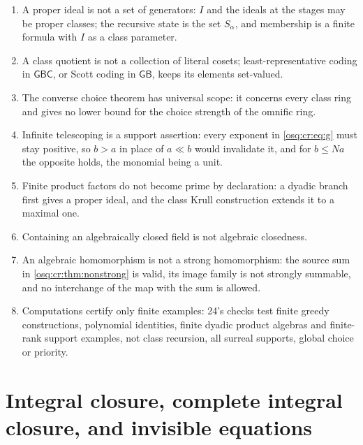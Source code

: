 \documentclass[11pt,letterpaper]{article}
\numberwithin{equation}{section}
\theoremstyle{definition}
\theoremstyle{remark}
\theoremstyle{plain}
\begin{document}
\begin{enumerate}
\item A proper ideal is not a set of generators: $I$ and the ideals at the stages may be proper classes; the recursive state is the set $S_\alpha$, and
membership is a finite formula with $I$ as a class parameter.
\item A class quotient is not a collection of literal cosets; least-representative coding in $\mathsf{GBC}$, or Scott coding in $\mathsf{GB}$, keeps its
elements set-valued.
\item The converse choice theorem has universal scope: it concerns every class ring and gives no lower bound for the choice strength of the omnific ring.
\item Infinite telescoping is a support assertion: every exponent in \eqref{osq:cr:eq:g} must stay positive, so $b>a$ in place of $a\ll b$ would invalidate
it, and for $b\le Na$ the opposite holds, the monomial being a unit.
\item Finite product factors do not become prime by declaration: a dyadic branch first gives a proper ideal, and the class Krull construction extends it
to a maximal one.
\item Containing an algebraically closed field is not algebraic closedness.
\item An algebraic homomorphism is not a strong homomorphism: the source sum in \cref{osq:cr:thm:nonstrong} is valid, its image family is not strongly
summable, and no interchange of the map with the sum is allowed.
\item Computations certify only finite examples: 24's checks test finite greedy constructions, polynomial identities, finite dyadic product algebras and
finite-rank support examples, not class recursion, all surreal supports, global choice or priority.
\end{enumerate}

\section{Integral closure, complete integral closure, and invisible equations}
\label{osq:sec:closure}
\end{document}
